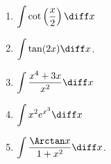 \begin{multicols}{3}
\begin{enumerate}[ref={\fcProblemRef}]
\item $\displaystyle \int \cot \left(\frac{x}{2}\right) \diff x$


\item $\displaystyle\int \tan (2x) \diff x$.

\item ${\displaystyle \int \frac{x^4 + 3x}{x^2} \diff x}$


\item ${\displaystyle \int x^2 e^{x^3} \diff x}$

\item \label{problemIntArctan(x)/(1+x^2)dx} $\displaystyle\int \frac{\Arctan x}{1+x^2} \diff x$. 

\end{enumerate}
\end{multicols}